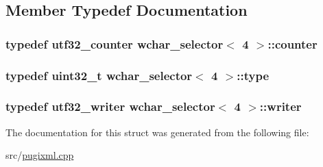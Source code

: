 \subsection{Member Typedef Documentation}
\hypertarget{structwchar__selector_3_014_01_4_a7d7c585ae0819660112b8c8683971b97}{
\subsubsection[{counter}]{\setlength{\rightskip}{0pt plus 5cm}typedef {\bf utf32\_\-counter} wchar\_\-selector$<$ 4 $>$::{\bf counter}}}
\label{structwchar__selector_3_014_01_4_a7d7c585ae0819660112b8c8683971b97}
\hypertarget{structwchar__selector_3_014_01_4_af45ac603ab6fefec66e5c29044b4eed6}{
\subsubsection[{type}]{\setlength{\rightskip}{0pt plus 5cm}typedef uint32\_\-t wchar\_\-selector$<$ 4 $>$::{\bf type}}}
\label{structwchar__selector_3_014_01_4_af45ac603ab6fefec66e5c29044b4eed6}
\hypertarget{structwchar__selector_3_014_01_4_a48042e7fe51c4661397ae7afe3905243}{
\subsubsection[{writer}]{\setlength{\rightskip}{0pt plus 5cm}typedef {\bf utf32\_\-writer} wchar\_\-selector$<$ 4 $>$::{\bf writer}}}
\label{structwchar__selector_3_014_01_4_a48042e7fe51c4661397ae7afe3905243}


The documentation for this struct was generated from the following file:\begin{DoxyCompactItemize}
\item 
src/\hyperlink{pugixml_8cpp}{pugixml.cpp}\end{DoxyCompactItemize}
